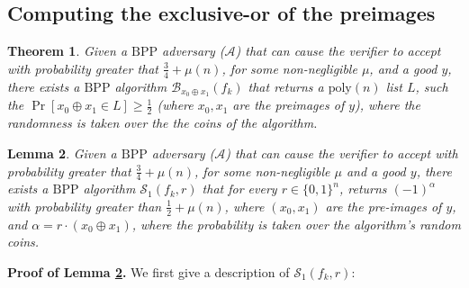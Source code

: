 \documentclass{article}
\newtheorem{thm}{Theorem}
\newtheorem{lem}[thm]{Lemma}
\begin{document}
\subsection{Computing the exclusive-or of the preimages}
\begin{thm}
\label{xorrecovery}
Given a $\mathrm{BPP}$ adversary ($\mathcal{A}$) that can cause the verifier to accept with probability greater that $\frac{3}{4}+\mu(n)$, for some non-negligible $\mu$, and a good $y$, there exists a $\mathrm{BPP}$ algorithm $\mathcal{B}_{x_{0}\oplus x_{1}}(f_{k})$ that returns a $\mathrm{poly}(n)$ list $L$, such the $\Pr[x_{0}\oplus x_{1}\in L]\geq\frac{1}{2}$ (where $x_{0}, x_{1}$ are the preimages of $y$), where the randomness is taken over the the coins of the algorithm.
\end{thm}

\begin{lem}
\label{lemmas1}
Given a $\mathrm{BPP}$ adversary ($\mathcal{A}$) that can cause the verifier to accept with probability greater that $\frac{3}{4}+\mu(n)$, for some non-negligible $\mu$ and a good $y$, there exists a $\mathrm{BPP}$ algorithm $\mathcal{S}_{1}(f_{k}, r)$ that for every $r\in\{0,1\}^{n}$, returns $(-1)^{\alpha}$ with probability greater than $\frac{1}{2}+\mu(n)$, where $(x_{0}, x_{1})$ are the pre-images of $y$, and $\alpha = r\cdot (x_{0} \oplus x_{1})$, where the probability is taken over the algorithm's random coins.
\end{lem}
\textbf{Proof of Lemma \ref{lemmas1}.} We first give a description of $\mathcal{S}_{1}(f_{k}, r)$:
\end{document}
